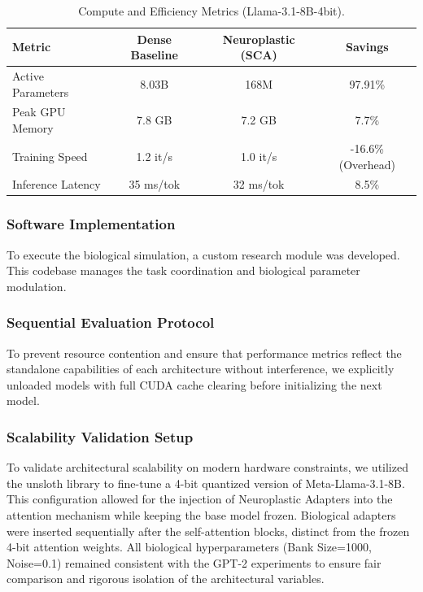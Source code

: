 \documentclass[11pt, letterpaper]{article}
\begin{document}
\begin{table}[htbp]
    \centering
    \caption{Compute and Efficiency Metrics (Llama-3.1-8B-4bit).}
    \label{tab:compute_metrics}
    \begin{tabular}{@{} l c c c @{}}
        \toprule
        \textbf{Metric} & \textbf{Dense Baseline} & \textbf{Neuroplastic (SCA)} & \textbf{Savings} \\
        \midrule
        Active Parameters & 8.03B & 168M & 97.91\% \\
        Peak GPU Memory & 7.8 GB & 7.2 GB & 7.7\% \\
        Training Speed & 1.2 it/s & 1.0 it/s & -16.6\% (Overhead) \\
        Inference Latency & 35 ms/tok & 32 ms/tok & 8.5\% \\
        \bottomrule
    \end{tabular}
\end{table}

\subsubsection{Software Implementation}
To execute the biological simulation, a custom research module was developed. This codebase manages the task coordination and biological parameter modulation.

\subsubsection{Sequential Evaluation Protocol}
To prevent resource contention and ensure that performance metrics reflect the standalone capabilities of each architecture without interference, we explicitly unloaded models with full CUDA cache clearing before initializing the next model.

\subsubsection{Scalability Validation Setup}
To validate architectural scalability on modern hardware constraints, we 
utilized the unsloth library to fine-tune a 4-bit quantized version of Meta-Llama-3.1-8B. This configuration allowed for the injection of Neuroplastic 
Adapters into the attention mechanism while keeping the base model frozen. 
Biological adapters were inserted sequentially after the self-attention blocks, distinct from the frozen 4-bit attention weights. All biological hyperparameters (Bank Size=1000, Noise=0.1) remained consistent with the GPT-2 experiments to ensure fair comparison and rigorous isolation of the architectural variables.
\end{document}
